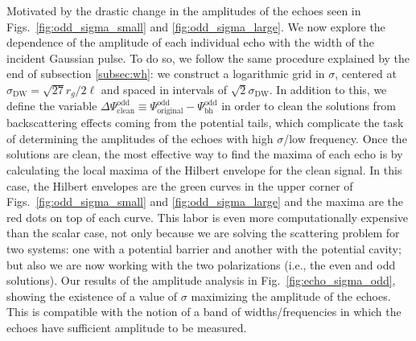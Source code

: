 \documentclass[article,aps,nofootinbib,twocolumn,superscriptaddress]{revtex4-1}
\begin{document}
Motivated by the drastic change in the amplitudes of the echoes seen in Figs.~\ref{fig:odd_sigma_small} and \ref{fig:odd_sigma_large}. We now explore the dependence of the amplitude of each individual echo with the width of the incident Gaussian pulse. To do so, we follow the same procedure explained by the end of subsection \ref{subsec:wh}: we construct a logarithmic grid in $\sigma$, centered at $\sigma_{\mathrm{DW}}=\sqrt{27}r_g/2\ell$ and spaced in intervals of $\sqrt{2}\sigma_{\mathrm{DW}}$. In addition to this, we define the variable $\Delta\Psi^{\mathrm{odd}}_{\mathrm{clean}}\equiv\Psi^{\mathrm{odd}}_{\mathrm{original}}-\Psi^{\mathrm{odd}}_{\mathrm{bh}}$ in order to clean the solutions from backscattering effects coming from the potential tails, which complicate the task of determining the amplitudes of the echoes with high $\sigma$/low frequency. Once the solutions are clean, the most effective way to find the maxima of each echo is by calculating the local maxima of the Hilbert envelope for the clean signal. In this case, the Hilbert envelopes are the green curves in the upper corner of Figs.~\ref{fig:odd_sigma_small} and \ref{fig:odd_sigma_large} and the maxima are the red dots on top of each curve. 
This labor is even more computationally expensive than the scalar case, not only because we are solving the scattering problem for two systems: one with a potential barrier and another with the potential cavity; but also we are now working with the two polarizations (i.e., the even and odd solutions). Our results of the amplitude analysis in Fig.~\ref{fig:echo_sigma_odd}, showing the existence of a value of $\sigma$ maximizing the amplitude of the echoes. This is compatible with the notion of a band of widths/frequencies in which the echoes have sufficient amplitude to be measured.    
\end{document}
